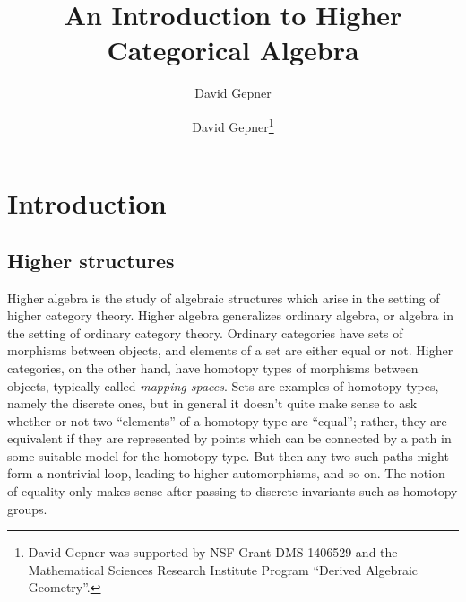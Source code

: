 \documentclass{article}
\title{An Introduction to Higher Categorical Algebra}
\author{David Gepner}
\author{David Gepner\thanks{David Gepner was supported by NSF Grant DMS-1406529 and the Mathematical Sciences Research Institute Program ``Derived Algebraic Geometry''.}}
\theoremstyle{definition}
\begin{document}
\maketitle

\tableofcontents


%






\section{Introduction}\label{sec:it}



\subsection{Higher structures}

Higher algebra is the study of algebraic structures which arise in the setting of higher category theory.
Higher algebra generalizes ordinary algebra, or algebra in the setting of ordinary category theory.
Ordinary categories have sets of morphisms between objects, and elements of a set are either equal or not.
Higher categories, on the other hand, have homotopy types of morphisms between objects, typically called {\em mapping spaces}. Sets are examples of homotopy types, namely the discrete ones, but in general it doesn't quite make sense to ask whether or not two ``elements'' of a homotopy type are ``equal''; rather, they are equivalent if they are represented by points which can be connected by a path in some suitable model for the homotopy type. But then any two such paths might form a nontrivial loop, leading to higher automorphisms, and so on.
The notion of equality only makes sense after passing to discrete invariants such as homotopy groups.
\end{document}
